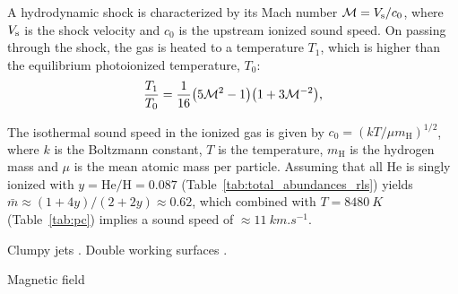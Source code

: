 \documentclass[useAMS, usenatbib]{mnras}
\begin{document}
A hydrodynamic shock is characterized by its Mach number \(\mathcal{M} = V_{\mathrm{s}} / c_0\),
where \(V_{\mathrm{s}}\) is the shock velocity and \(c_0\) is the upstream ionized sound speed.
On passing through the shock, the gas is heated 
\citep{ZelDovich:1969a} to a temperature \(T_1\),
which is higher than the equilibrium photoionized temperature, \(T_0\):
\begin{equation}
  \label{eq:T-vs-mach}
  \frac{T_1}{T_0} = \frac{1}{16} \bigl( 5 \mathcal{M}^2 - 1 \bigr)
  \bigl( 1 + 3\mathcal{M}^{-2} \bigr),
\end{equation}


The isothermal sound speed in the ionized gas is given by
\(c_0 = (k T / \mu m_{\mathrm{H}})^{1/2}\),
where \(k\) is the Boltzmann constant, \(T\) is the temperature,
\(m_{\mathrm{H}}\) is the hydrogen mass
and \(\mu\) is the mean atomic mass per particle.
Assuming that all He is singly ionized with
\(y = \mathrm{He/H} = 0.087\) (Table~\ref{tab:total_abundances_rls}) yields
\(\bar{m} \approx (1 + 4 y) / (2 + 2 y) \approx 0.62\),
which combined with \(T = \SI{8480}{K}\) (Table~\ref{tab:pc})
implies a sound speed of \(\approx\SI{11}{km.s^{-1}}\). 

Clumpy jets \citep{Yirak:2009a, Yirak:2012a}.  Double working surfaces \citep{Raga:2017b}.   

Magnetic field \citep{Hansen:2017a, Pudritz:2019a}


\end{document}
